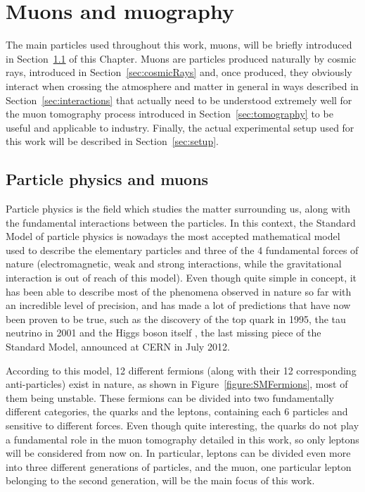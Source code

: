 \documentclass[a4paper, 11pt]{report}
\begin{document}
\chapter{Muons and muography}

The main particles used throughout this work, muons, will be briefly introduced in Section~\ref{sec:particlePhysics} of this Chapter. Muons are particles produced naturally by cosmic rays, introduced in Section~\ref{sec:cosmicRays} and, once produced, they obviously interact when crossing the atmosphere and matter in general in ways described in Section~\ref{sec:interactions} that actually need to be understood extremely well for the muon tomography process introduced in Section~\ref{sec:tomography} to be useful and applicable to industry. Finally, the actual experimental setup used for this work will be described in Section~\ref{sec:setup}.

\section{Particle physics and muons} \label{sec:particlePhysics}

Particle physics is the field which studies the matter surrounding us, along with the fundamental interactions between the particles. In this context, the Standard Model of particle physics \cite{SM} is nowadays the most accepted mathematical model used to describe the elementary particles and three of the 4 fundamental forces of nature (electromagnetic, weak and strong interactions, while the gravitational interaction is out of reach of this model). Even though quite simple in concept, it has been able to describe most of the phenomena observed in nature so far with an incredible level of precision, and has made a lot of predictions that have now been proven to be true, such as the discovery of the top quark \cite{topQuark} in 1995, the tau neutrino \cite{tauNeutrino} in 2001 and the Higgs boson itself \cite{HiggsDiscovery1, HiggsDiscovery2}, the last missing piece of the Standard Model, announced at CERN in July 2012. 

According to this model, 12 different fermions (along with their 12 corresponding anti-particles) exist in nature, as shown in Figure~\ref{figure:SMFermions}, most of them being unstable. These fermions can be divided into two fundamentally different categories, the quarks and the leptons, containing each 6 particles and sensitive to different forces. Even though quite interesting, the quarks do not play a fundamental role in the muon tomography detailed in this work, so only leptons will be considered from now on. In particular, leptons can be divided even more into three different generations of particles, and the muon, one particular lepton belonging to the second generation, will be the main focus of this work.
\end{document}
